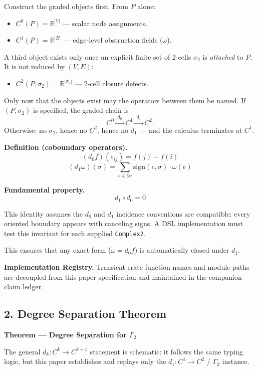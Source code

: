 \documentclass[
]{article}
\providecommand{\tightlist}{%
  \setlength{\itemsep}{0pt}\setlength{\parskip}{0pt}}
\providecommand{\tightlist}{%
  \setlength{\itemsep}{0pt}\setlength{\parskip}{0pt}}
\begin{document}
Construct the graded objects first. From \(P\) alone:

\begin{itemize}
\tightlist
\item
  \(C^0(P) = \mathbb{R}^{|V|}\) --- scalar node assignments.
\item
  \(C^1(P) = \mathbb{R}^{|E|}\) --- edge-level obstruction fields (\(\omega\)).
\end{itemize}

A third object exists only once an explicit finite set of 2-cells \(\sigma_2\) is \emph{attached} to \(P\).
It is not induced by \((V,E)\):

\begin{itemize}
\tightlist
\item
  \(C^2(P,\sigma_2) = \mathbb{R}^{|\sigma_2|}\) --- 2-cell closure defects.
\end{itemize}

Only now that the objects exist may the operators between them be named. If \((P, \sigma_2)\) is
specified, the graded chain is
\[
C^0 \xrightarrow{\;d_0\;} C^1 \xrightarrow{\;d_1\;} C^2 .
\]
Otherwise: no \(\sigma_2\), hence no \(C^2\), hence no \(d_1\) --- and the calculus terminates at \(C^1\).

\textbf{Definition (coboundary operators).}
\[
(d_0 f)(e_{ij}) = f(j) - f(i)
\]
\[
(d_1 \omega)(\sigma) = \sum_{e \in \partial\sigma} \mathrm{sign}(e, \sigma) \cdot \omega(e)
\]

\textbf{Fundamental property.}
\[
d_1 \circ d_0 = 0
\]

This identity assumes the \(d_0\) and \(d_1\) incidence conventions are compatible: every oriented boundary appears with canceling signs. A DSL implementation must test this invariant for each supplied \texttt{Complex2}.

This ensures that any exact form (\(\omega = d_0 f\)) is automatically closed under \(d_1\).

\textbf{Implementation Registry.} Transient crate function names and module paths are decoupled from this paper specification and maintained in the companion claim ledger.

\subsection{2. Degree Separation Theorem}\label{degree-separation-theorem}

\textbf{Theorem --- Degree Separation for \(\Gamma_2\)}

The general \(d_k:C^k\to C^{k+1}\) statement is schematic: it follows the same typing logic, but this paper establishes and replays only the \(d_1:C^1\to C^2\) / \(\Gamma_2\) instance.
\end{document}
